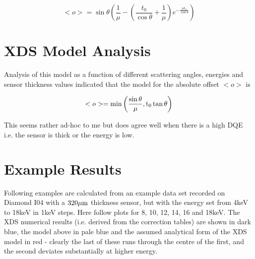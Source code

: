 \documentclass{article}
\begin{document}
\begin{equation}
<o> = \sin \theta \left( \frac{1}{\mu} - \left( \frac{t_0}{\cos
      \theta} + \frac{1}{\mu} \right) e^{- \frac{\mu t_0}{\cos \theta}} \right)
\end{equation}


\section{XDS Model Analysis}

Analysis of this model as a function of different scattering angles,
energies and sensor thickness values indicated that the model for the
absolute offset $<o>$ is

\begin{equation}
<o> = \rm{min}\left(\frac{\sin \theta}{\mu}, t_0 \tan \theta \right)
\end{equation}

\noindent
This seems rather ad-hoc to me but does agree well when there is a
high DQE i.e. the sensor is thick or the energy is low.

\section{Example Results}

Following examples are calculated from an example data set recorded on
Diamond I04 with a $320 \rm{\mu m}$ thickness sensor, but with the
energy set from 4keV to 18keV in 1keV steps. Here follow plots for 8,
10, 12, 14, 16 and 18keV. The XDS numerical results (i.e. derived from
the correction tables) are shown in dark blue, the model above in pale
blue and the assumed analytical form of the XDS model in red - clearly
the last of these runs through the centre of the first, and the second
deviates substantially at higher energy.
\end{document}
